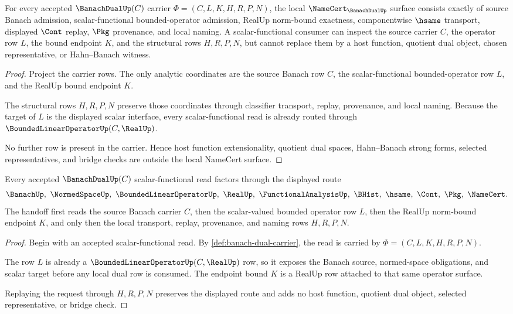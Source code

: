 \begin{theorem}
\label{thm:banach-dual-namecert-obligations}
For every accepted $\BanachDualUp(C)$ carrier $\Phi=(C,L,K,H,R,P,N)$, the local $\NameCert_{\BanachDualUp}$ surface consists exactly of source Banach admission, scalar-functional bounded-operator admission, RealUp norm-bound exactness, componentwise $\hsame$ transport, displayed $\Cont$ replay, $\Pkg$ provenance, and local naming. A scalar-functional consumer can inspect the source carrier $C$, the operator row $L$, the bound endpoint $K$, and the structural rows $H,R,P,N$, but cannot replace them by a host function, quotient dual object, chosen representative, or Hahn--Banach witness.
\end{theorem}
\begin{proof}
Project the carrier rows. The only analytic coordinates are the source Banach row $C$, the scalar-functional bounded-operator row $L$, and the RealUp bound endpoint $K$.

The structural rows $H,R,P,N$ preserve those coordinates through classifier transport, replay, provenance, and local naming. Because the target of $L$ is the displayed scalar interface, every scalar-functional read is already routed through $\BoundedLinearOperatorUp(C,\RealUp)$.

No further row is present in the carrier. Hence host function extensionality, quotient dual spaces, Hahn--Banach strong forms, selected representatives, and bridge checks are outside the local NameCert surface.
\end{proof}

\begin{theorem}
\label{thm:banach-dual-operator-handoff}
Every accepted $\BanachDualUp(C)$ scalar-functional read factors through the displayed route
$$
\BanachUp,\ \NormedSpaceUp,\ \BoundedLinearOperatorUp,\ \RealUp,\ \FunctionalAnalysisUp,\ \BHist,\ \hsame,\ \Cont,\ \Pkg,\ \NameCert .
$$
The handoff first reads the source Banach carrier $C$, then the scalar-valued bounded operator row $L$, then the RealUp norm-bound endpoint $K$, and only then the local transport, replay, provenance, and naming rows $H,R,P,N$.
\end{theorem}
\begin{proof}
Begin with an accepted scalar-functional read. By \autoref{def:banach-dual-carrier}, the read is carried by $\Phi=(C,L,K,H,R,P,N)$.

The row $L$ is already a $\BoundedLinearOperatorUp(C,\RealUp)$ row, so it exposes the Banach source, normed-space obligations, and scalar target before any local dual row is consumed. The endpoint bound $K$ is a RealUp row attached to that same operator surface.

Replaying the request through $H,R,P,N$ preserves the displayed route and adds no host function, quotient dual object, selected representative, or bridge check.
\end{proof}

